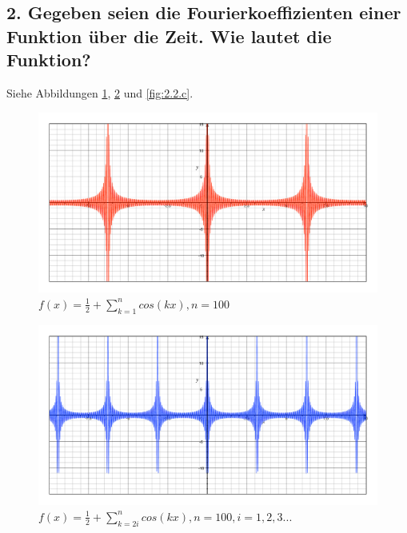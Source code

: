 \subsection*{2. Gegeben seien die Fourierkoeffizienten einer Funktion \"uber die Zeit. Wie lautet die Funktion?}
Siehe Abbildungen \ref{fig:2.2.a},  \ref{fig:2.2.b} und \ref{fig:2.2.c}.
\begin{figure}[p] %
   \centering
   \includegraphics[width=0.4\textheight]{Uebung2/Aufgabe_2_2_a.pdf} 
   \caption{$f(x)=\frac{1}{2}+\sum_{k=1}^n cos(kx), n=100$}
   \label{fig:2.2.a}
\end{figure}
\begin{figure}[p] %
   \centering
   \includegraphics[width=0.4\textheight]{Uebung2/Aufgabe_2_2_b.pdf} 
   \caption{$f(x)=\frac{1}{2}+\sum_{k=2i}^n cos(kx), n=100, i=1,2,3...$}
   \label{fig:2.2.b}
\end{figure}
